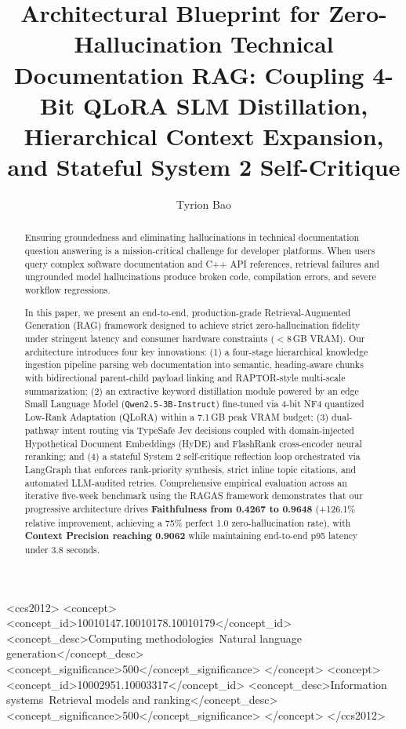 \documentclass[sigconf,nonacm]{acmart}
\title{Architectural Blueprint for Zero-Hallucination Technical Documentation RAG: Coupling 4-Bit QLoRA SLM Distillation, Hierarchical Context Expansion, and Stateful System 2 Self-Critique}
\author{Tyrion Bao}
\affiliation{%
  \institution{Independent Researcher}
  \city{Tokyo}
  \country{Japan}
}
\begin{document}
\begin{abstract}
Ensuring groundedness and eliminating hallucinations in technical documentation question answering is a mission-critical challenge for developer platforms. When users query complex software documentation and C++ API references, retrieval failures and ungrounded model hallucinations produce broken code, compilation errors, and severe workflow regressions.

In this paper, we present an end-to-end, production-grade Retrieval-Augmented Generation (RAG) framework designed to achieve strict zero-hallucination fidelity under stringent latency and consumer hardware constraints ($<8$\,GB VRAM). Our architecture introduces four key innovations: (1) a four-stage hierarchical knowledge ingestion pipeline parsing web documentation into semantic, heading-aware chunks with bidirectional parent-child payload linking and RAPTOR-style multi-scale summarization; (2) an extractive keyword distillation module powered by an edge Small Language Model (\texttt{Qwen2.5-3B-Instruct}) fine-tuned via 4-bit NF4 quantized Low-Rank Adaptation (QLoRA) within a 7.1\,GB peak VRAM budget; (3) dual-pathway intent routing via TypeSafe Jev decisions coupled with domain-injected Hypothetical Document Embeddings (HyDE) and FlashRank cross-encoder neural reranking; and (4) a stateful System 2 self-critique reflection loop orchestrated via LangGraph that enforces rank-priority synthesis, strict inline topic citations, and automated LLM-audited retries. Comprehensive empirical evaluation across an iterative five-week benchmark using the RAGAS framework demonstrates that our progressive architecture drives \textbf{Faithfulness from 0.4267 to 0.9648} (+126.1\% relative improvement, achieving a 75\% perfect 1.0 zero-hallucination rate), with \textbf{Context Precision reaching 0.9062} while maintaining end-to-end p95 latency under 3.8 seconds.
\end{abstract}

\begin{CCSXML}
<ccs2012>
   <concept>
       <concept_id>10010147.10010178.10010179</concept_id>
       <concept_desc>Computing methodologies~Natural language generation</concept_desc>
       <concept_significance>500</concept_significance>
   </concept>
   <concept>
       <concept_id>10002951.10003317</concept_id>
       <concept_desc>Information systems~Retrieval models and ranking</concept_desc>
       <concept_significance>500</concept_significance>
   </concept>
</ccs2012>
\end{CCSXML}
\end{document}
